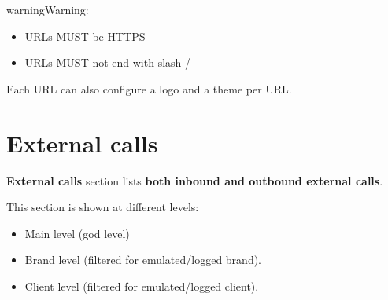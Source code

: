 \documentclass[letterpaper,10pt,english]{sphinxmanual}
\begin{document}
\begin{notice}{warning}{Warning:}\begin{itemize}
\item {} 
URLs MUST be HTTPS

\item {} 
URLs MUST not end with slash /

\end{itemize}
\end{notice}

Each URL can also configure a logo and a theme per URL.


\section{External calls}
\label{administration_portal/platform/external_calls:id1}\label{administration_portal/platform/external_calls::doc}\label{administration_portal/platform/external_calls:external-calls}
\textbf{External calls} section lists \textbf{both inbound and outbound external calls}.

This section is shown at different levels:
\begin{itemize}
\item {} 
Main level (god level)

\item {} 
Brand level (filtered for emulated/logged brand).

\item {} 
Client level (filtered for emulated/logged client).

\end{itemize}
\end{document}
